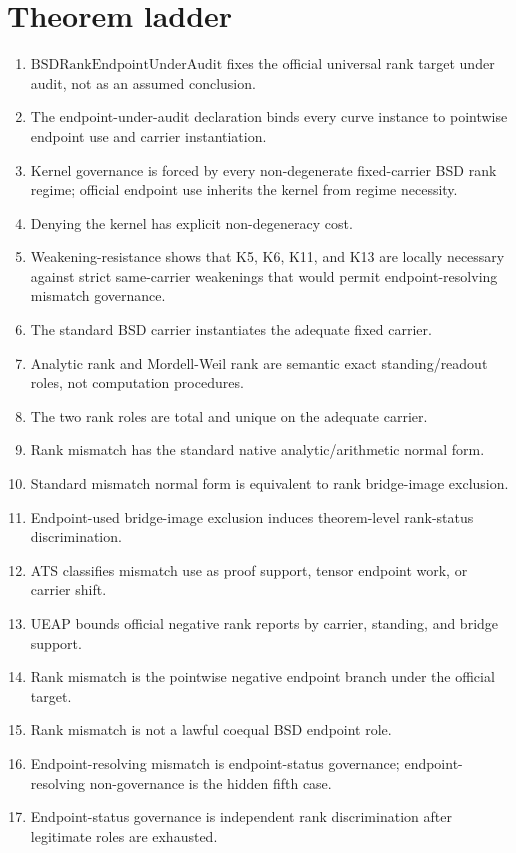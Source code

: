 \documentclass[11pt]{article}
\begin{document}
\section{Theorem ladder}
\begin{enumerate}
\item $\mathrm{BSDRankEndpointUnderAudit}$ fixes the official universal rank target under audit, not as an assumed conclusion.
\item The endpoint-under-audit declaration binds every curve instance to pointwise endpoint use and carrier instantiation.
\item Kernel governance is forced by every non-degenerate fixed-carrier BSD rank regime; official endpoint use inherits the kernel from regime necessity.
\item Denying the kernel has explicit non-degeneracy cost.
\item Weakening-resistance shows that K5, K6, K11, and K13 are locally necessary against strict same-carrier weakenings that would permit endpoint-resolving mismatch governance.
\item The standard BSD carrier instantiates the adequate fixed carrier.
\item Analytic rank and Mordell-Weil rank are semantic exact standing/readout roles, not computation procedures.
\item The two rank roles are total and unique on the adequate carrier.
\item Rank mismatch has the standard native analytic/arithmetic normal form.
\item Standard mismatch normal form is equivalent to rank bridge-image exclusion.
\item Endpoint-used bridge-image exclusion induces theorem-level rank-status discrimination.
\item ATS classifies mismatch use as proof support, tensor endpoint work, or carrier shift.
\item UEAP bounds official negative rank reports by carrier, standing, and bridge support.
\item Rank mismatch is the pointwise negative endpoint branch under the official target.
\item Rank mismatch is not a lawful coequal BSD endpoint role.
\item Endpoint-resolving mismatch is endpoint-status governance; endpoint-resolving non-governance is the hidden fifth case.
\item Endpoint-status governance is independent rank discrimination after legitimate roles are exhausted.

\end{enumerate}
\end{document}
